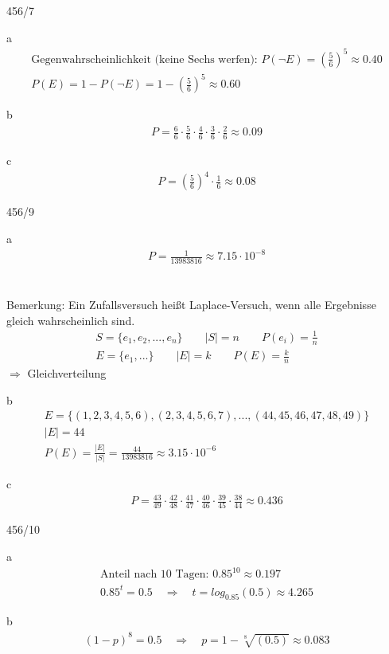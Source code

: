 \begin{exercise}{456/7}
  \item [a]
  \begin{gather*}
    \text{Gegenwahrscheinlichkeit (keine Sechs werfen): } P(\neg E) = (\frac{5}{6})^5 \approx 0.40 \\
    P(E) = 1 - P(\neg E) = 1 - (\frac{5}{6})^5 \approx 0.60
  \end{gather*}
  \item [b]
  \begin{gather*}
    P = \frac{6}{6} \cdot \frac{5}{6} \cdot \frac{4}{6} \cdot \frac{3}{6} \cdot \frac{2}{6} \approx 0.09
  \end{gather*}
  \item [c]
  \begin{gather*}
    P = (\frac{5}{6})^4 \cdot \frac{1}{6} \approx 0.08
  \end{gather*}
\end{exercise}
\begin{exercise}{456/9}
  \item [a]
  \begin{gather*}
    P = \frac{1}{13983816} \approx 7.15 \cdot 10^{-8}
  \end{gather*} \\\\
  Bemerkung: Ein Zufallsversuch heißt Laplace-Versuch, wenn alle Ergebnisse gleich wahrscheinlich sind.
  \begin{gather*}
    S = \{e_1, e_2, ..., e_n\} \qquad |S| = n \qquad P(e_i) = \frac{1}{n} \\
    E = \{e_1, ...\} \qquad |E| = k \qquad P(E) = \frac{k}{n}
  \end{gather*}
  $\Rightarrow$ Gleichverteilung
  \item [b]
  \begin{gather*}
    E = \{(1,2,3,4,5,6), (2,3,4,5,6,7), ..., (44,45,46,47,48,49)\} \\
    |E| = 44 \\
    P(E) = \frac{|E|}{|S|} = \frac{44}{13983816} \approx 3.15 \cdot 10^{-6}
  \end{gather*}
  \item [c]
  \begin{gather*}
    P = \frac{43}{49} \cdot \frac{42}{48} \cdot \frac{41}{47} \cdot \frac{40}{46} \cdot \frac{39}{45} \cdot \frac{38}{44} \approx 0.436
  \end{gather*}
\end{exercise}
\begin{exercise}{456/10}
  \item [a]
  \begin{gather*}
    \text{Anteil nach $10$ Tagen: } 0.85^{10} \approx 0.197 \\
    0.85^t = 0.5 \quad\Rightarrow\quad t = log_{0.85}(0.5) \approx 4.265
  \end{gather*}
  \item [b]
  \begin{gather*}
    (1 - p)^8 = 0.5 \quad\Rightarrow\quad p = 1 - \sqrt[8]{(0.5)} \approx 0.083
  \end{gather*}
\end{exercise}
